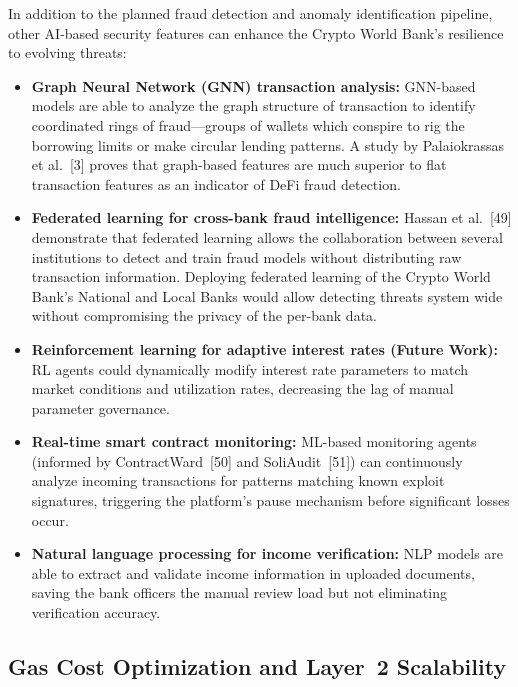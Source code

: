 \documentclass[12pt,a4paper]{report}
\begin{document}
In addition to the planned fraud detection and anomaly identification pipeline, other AI-based security features can enhance the Crypto World Bank's resilience to evolving threats:

\begin{itemize}[noitemsep]
\item \textbf{Graph Neural Network (GNN) transaction analysis:} GNN-based models are able to analyze the graph structure of transaction to identify coordinated rings of fraud---groups of wallets which conspire to rig the borrowing limits or make circular lending patterns. A study by Palaiokrassas et al.~[3] proves that graph-based features are much superior to flat transaction features as an indicator of DeFi fraud detection.

\item \textbf{Federated learning for cross-bank fraud intelligence:} Hassan et al.~[49] demonstrate that federated learning allows the collaboration between several institutions to detect and train fraud models without distributing raw transaction information. Deploying federated learning of the Crypto World Bank's National and Local Banks would allow detecting threats system wide without compromising the privacy of the per-bank data.

\item \textbf{Reinforcement learning for adaptive interest rates (Future Work):} RL agents could dynamically modify interest rate parameters to match market conditions and utilization rates, decreasing the lag of manual parameter governance.

\item \textbf{Real-time smart contract monitoring:} ML-based monitoring agents (informed by ContractWard~[50] and SoliAudit~[51]) can continuously analyze incoming transactions for patterns matching known exploit signatures, triggering the platform's pause mechanism before significant losses occur.

\item \textbf{Natural language processing for income verification:} NLP models are able to extract and validate income information in uploaded documents, saving the bank officers the manual review load but not eliminating verification accuracy.
\end{itemize}

\subsection{Gas Cost Optimization and Layer~2 Scalability}
\end{document}
